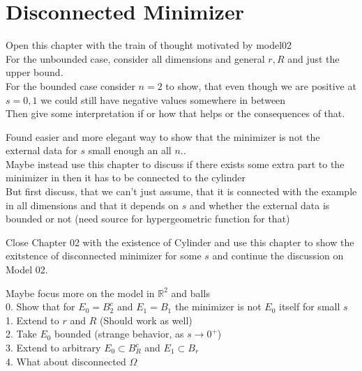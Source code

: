 \chapter{Disconnected Minimizer}
\label{ch:disconnected_minimizer}


\begin{IDEA}
	Open this chapter with the train of thought motivated by model02\\
	For the unbounded case, consider all dimensions and general \( r,R \) and just the upper
	bound.\\
	For the bounded case consider \( n = 2 \) to show, that even though we are positive at
	\( s=0,1 \) we could still have negative values somewhere in between\\
	Then give some interpretation if or how that helps or the consequences of that.
\end{IDEA}

\begin{CHECK}
	Found easier and more elegant way to show that the minimizer is not the external data
	for \( s \) small enough an all \( n \)..\\
	Maybe instead use this chapter to discuss if there exists some extra part to the
	minimizer in  then it has to be connected to the cylinder\\
	But first discuss, that we can't just assume, that it is connected with the example in
	all dimensions and that it depends on \( s \) and whether the external data is bounded
	or not (need source for hypergeometric function for that)
\end{CHECK}

\begin{IDEA}
	Close Chapter 02 with the existence of Cylinder and use this chapter to show the
	exitstence of disconnected minimizer for some \( s \) and continue the discussion on
	Model 02.
\end{IDEA}

\begin{TODO}
	Maybe focus more on the model in \( \mathbb{R}^2 \) and balls\\
	0. Show that for \( E_0 = B_2^c \) and \( E_1 = B_1 \) the minimizer is not \( E_0 \)
	itself for small \( s \) \\
	1. Extend to \( r \) and \( R \) (Should work as well)\\
	2. Take \( E_0 \) bounded (strange behavior, as \( s \to 0^ + \))\\
	3. Extend to arbitrary \( E_0 \subset B_R^c \) and \( E_1 \subset B_r \) \\
	4. What about disconnected \( \Omega \)
\end{TODO}

